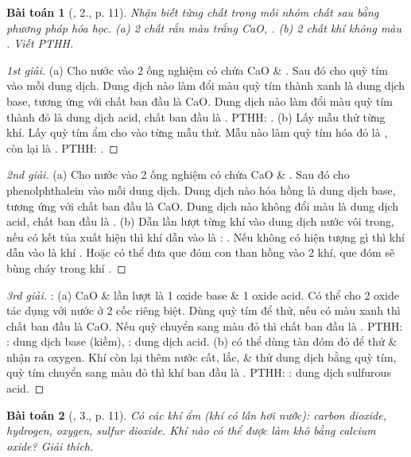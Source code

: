 \documentclass{article}
\newtheorem{baitoan}{Bài toán}
\begin{document}
\begin{baitoan}[\cite{SGK_Hoa_Hoc_9}, 2., p. 11]
	Nhận biết từng chất trong mỗi nhóm chất sau bằng phương pháp hóa học. (a) 2 chất rắn màu trắng {\rm CaO, }. (b) 2 chất khí không màu {\rm{}}. Viết {\rm PTHH}.
\end{baitoan}

\begin{proof}[1st giải]
	(a) Cho nước vào 2 ống nghiệm có chứa CaO \& . Sau đó cho quỳ tím vào mỗi dung dịch. Dung dịch nào làm đổi màu quỳ tím thành xanh là dung dịch base, tương ứng với chất ban đầu là CaO. Dung dịch nào làm đổi màu quỳ tím thành đỏ là dung dịch acid, chất ban đầu là . PTHH: . (b) Lấy mẫu thử từng khí. Lấy quỳ tím ẩm cho vào từng mẫu thử. Mẫu nào làm quỳ tím hóa đỏ là , còn lại là . PTHH: .
\end{proof}

\begin{proof}[2nd giải]
	(a) Cho nước vào 2 ống nghiệm có chứa CaO \& . Sau đó cho phenolphthalein vào mỗi dung dịch. Dung dịch nào hóa hồng là dung dịch base, tương ứng với chất ban đầu là CaO. Dung dịch nào không đổi màu là dung dịch acid, chất ban đầu là . (b) Dẫn lần lượt từng khí vào dung dịch nước vôi trong, nếu có kết tủa xuất hiện thì khí dẫn vào là : . Nếu không có hiện tượng gì thì khí dẫn vào là khí . Hoặc có thể đưa que đóm con than hồng vào 2 khí, que đóm sẽ bùng cháy trong khí .
\end{proof}

\begin{proof}[3rd giải]
	\cite{Ninh_giai_BT_Hoa_Hoc_9}: (a) CaO \&  lần lượt là 1 oxide base \& 1 oxide acid. Có thể cho 2 oxide tác dụng với nước ở 2 cốc riêng biệt. Dùng quỳ tím để thử, nếu có màu xanh thì chất ban đầu là CaO. Nếu quỳ chuyển sang màu đỏ thì chất ban đầu là . PTHH: : dung dịch base (kiềm), : dung dịch acid. (b)  có thể dùng tàn đóm đỏ để thử \& nhận ra oxygen. Khí còn lại thêm nước cất, lắc, \& thử dung dịch bằng quỳ tím, quỳ tím chuyển sang màu đỏ thì khí ban đầu là . PTHH: : dung dịch sulfurous acid.
\end{proof}

\begin{baitoan}[\cite{SGK_Hoa_Hoc_9}, 3., p. 11]
	Có các khí ẩm (khí có lẫn hơi nước): carbon dioxide, hydrogen, oxygen, sulfur dioxide. Khí nào có thể được làm khô bằng calcium oxide? Giải thích.
\end{baitoan}
\end{document}
